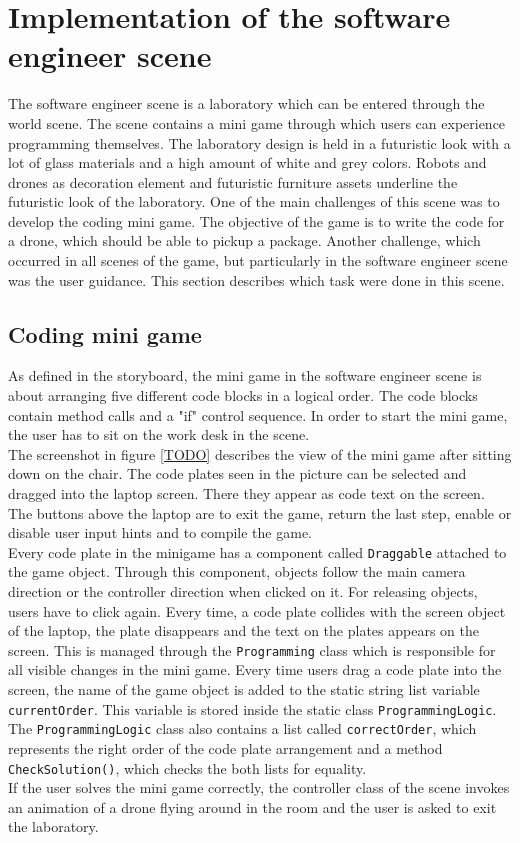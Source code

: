 \section{Implementation of the software engineer scene}
The software engineer scene is a laboratory which can be entered through the world scene. The scene contains a mini game through which users can experience programming themselves. The laboratory design is held in a futuristic look with a lot of glass materials and a high amount of white and grey colors. Robots and drones as decoration element and futuristic furniture assets underline the futuristic look of the laboratory. One of the main challenges of this scene was to develop the coding mini game. The objective of the game is to write the code for a drone, which should be able to pickup a package. Another challenge, which occurred in all scenes of the game, but particularly in the software engineer scene was the user guidance. This section describes which task were done in this scene.
\subsection{Coding mini game}
As defined in the storyboard, the mini game in the software engineer scene is about arranging five different code blocks in a logical order. The code blocks contain method calls and a "if" control sequence. In order to start the mini game, the user has to sit on the work desk in the scene. \\
The screenshot in figure \ref{TODO} describes the view of the mini game after sitting down on the chair. The code plates seen in the picture can be selected and dragged into the laptop screen. There they appear as code text on the screen. The buttons above the laptop are to exit the game, return the last step, enable or disable user input hints and to compile the game. \\
Every code plate in the minigame has a component called \texttt{Draggable} attached to the game object. Through this component, objects follow the main camera direction or the controller direction when clicked on it. For releasing objects, users have to click again. Every time, a code plate collides with the screen object of the laptop, the plate disappears and the text on the plates appears on the screen. This is managed through the \texttt{Programming} class which is responsible for all visible changes in the mini game. Every time users drag a code plate into the screen, the name of the game object is added to the static string list variable \texttt{currentOrder}. This variable is stored inside the static class \texttt{ProgrammingLogic}. The \texttt{ProgrammingLogic} class also contains a list called \texttt{correctOrder}, which represents the right order of the code plate arrangement and a method \texttt{CheckSolution()}, which checks the both lists for equality.\\
If the user solves the mini game correctly, the controller class of the scene invokes an animation of a drone flying around in the room and the user is asked to exit the laboratory.
